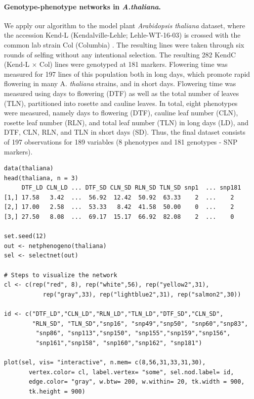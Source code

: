 \paragraph{Genotype-phenotype networks in \emph{A.thaliana}.} We apply our algorithm to the model plant \emph{Arabidopsis thaliana} dataset, where the accession Kend-L (Kendalville-Lehle; Lehle-WT-16-03) is crossed with the common lab strain Col (Co\-lum\-bi\-a) \citep{balasubramanian2009qtl}. The resulting lines were taken through six rounds of selfing without any intentional selection. The resulting 282 KendC (Kend-L $\times$ Col) lines were genotyped at 181 markers.  Flowering time was measured for 197 lines of this population both in long days, which promote rapid flowering in many A. \emph{thaliana} strains, and in short days. Flowering time was measured using days to flowering (DTF) as well as the total number of leaves (TLN), partitioned into rosette and cauline leaves. In total, eight phenotypes were measured, namely days to flowering (DTF), cauline leaf number (CLN), rosette leaf number (RLN), and total leaf number (TLN) in long days (LD), and DTF, CLN, RLN, and TLN in short days (SD). Thus, the final dataset consists of 197 observations for 189 variables (8 phenotypes and 181 genotypes - SNP markers). 
\begin{verbatim}
data(thaliana)
head(thaliana, n = 3)
     DTF_LD CLN_LD ... DTF_SD CLN_SD RLN_SD TLN_SD snp1  ... snp181
[1,] 17.58   3.42  ...  56.92  12.42  50.92  63.33    2  ...    2
[2,] 17.00   2.58  ...  53.33   8.42  41.58  50.00    0  ...    2
[3,] 27.50   8.08  ...  69.17  15.17  66.92  82.08    2  ...    0

set.seed(12)
out <- netphenogeno(thaliana)
sel <- selectnet(out)

# Steps to visualize the network
cl <- c(rep("red", 8), rep("white",56), rep("yellow2",31),
           rep("gray",33), rep("lightblue2",31), rep("salmon2",30))

id <- c("DTF_LD","CLN_LD","RLN_LD","TLN_LD","DTF_SD","CLN_SD", 
        "RLN_SD", "TLN_SD","snp16", "snp49","snp50", "snp60","snp83", 
         "snp86", "snp113","snp150", "snp155","snp159","snp156",
         "snp161","snp158", "snp160","snp162", "snp181")

plot(sel, vis= "interactive", n.mem= c(8,56,31,33,31,30),
       vertex.color= cl, label.vertex= "some", sel.nod.label= id,
       edge.color= "gray", w.btw= 200, w.within= 20, tk.width = 900,
       tk.height = 900)
\end{verbatim}
